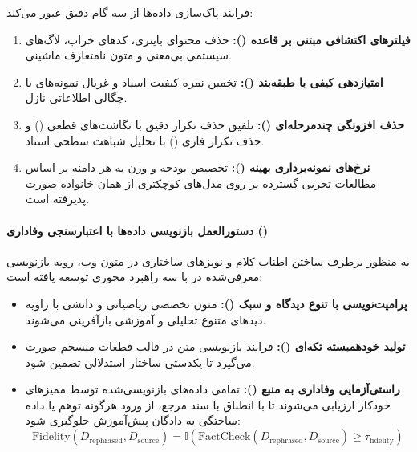 فرایند پاک‌سازی داده‌ها از سه گام دقیق عبور می‌کند:
\begin{enumerate}
    \item \textbf{فیلترهای اکتشافی مبتنی بر قاعده ():} حذف محتوای باینری، کدهای خراب، لاگ‌های سیستمی بی‌معنی و متون نامتعارف ماشینی.
    \item \textbf{امتیازدهی کیفی با طبقه‌بند ():} تخمین نمره کیفیت اسناد و غربال نمونه‌های با چگالی اطلاعاتی نازل.
    \item \textbf{حذف افزونگی چندمرحله‌ای ():} تلفیق حذف تکرار دقیق با نگاشت‌های قطعی () و حذف تکرار فازی () با تحلیل شباهت سطحی اسناد.
    \item \textbf{نرخ‌های نمونه‌برداری بهینه ():} تخصیص بودجه و وزن به هر دامنه بر اساس مطالعات تجربی گسترده بر روی مدل‌های کوچکتری از همان خانواده صورت پذیرفته است.
\end{enumerate}

\paragraph*{دستورالعمل بازنویسی داده‌ها با اعتبارسنجی وفاداری ()}
به منظور برطرف ساختن اطناب کلام و نویزهای ساختاری در متون وب، رویه بازنویسی معرفی‌شده در  \cite{kimi2025k2} با سه راهبرد محوری توسعه یافته است:
\begin{itemize}
    \item \textbf{پرامپت‌نویسی با تنوع دیدگاه و سبک ():} متون تخصصی ریاضیاتی و دانشی با زاویه دیدهای متنوع تحلیلی و آموزشی بازآفرینی می‌شوند.
    \item \textbf{تولید خودهمبسته تکه‌ای ():} فرایند بازنویسی متن در قالب قطعات منسجم صورت می‌گیرد تا یکدستی ساختار استدلالی تضمین شود.
    \item \textbf{راستی‌آزمایی وفاداری به منبع ():} تمامی داده‌های بازنویسی‌شده توسط ممیزهای خودکار ارزیابی می‌شوند تا با انطباق با سند مرجع، از ورود هرگونه توهم یا داده ساختگی به دادگان پیش‌آموزش جلوگیری شود:
    \begin{equation}
        \text{Fidelity}(D_{\text{rephrased}}, D_{\text{source}}) = \mathbb{I}\left( \text{FactCheck}(D_{\text{rephrased}}, D_{\text{source}}) \ge \tau_{\text{fidelity}} \right)
    \end{equation}
\end{itemize}

